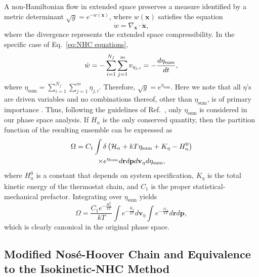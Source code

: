 \documentclass[
aip,
jcp,
reprint,
]{revtex4-1}
\newcommand{\vt}[1]{\boldsymbol{\mathbf{#1}}}          %
\begin{document}
A non-Hamiltonian flow in extended space preserves a measure identified by a metric determinant $\sqrt{g} = e^{-w(\vt x)}$, where $w(\vt x)$ satisfies the equation \cite{Tuckerman_1999, Tuckerman_2001}
\begin{equation}
\label{eq:extended space compressibility}
\dot{w} = \nabla_{\vt x} \cdot \dot{\vt x},
\end{equation}
where the divergence represents the extended space compressibility.
In the specific case of Eq.~\eqref{eq:NHC equations},
\begin{equation}
\dot{w} = -\sum_{i=1}^{N_f} \sum_{j=1}^m v_{\eta_{j,i}} = -\frac{d\eta_{\rm sum}}{dt},
\end{equation}
where $\eta_\mathrm{sum} = \sum_{i=1}^{N_f} \sum_{j=1}^m \eta_{j,i}$.
Therefore, $\sqrt{g} = e^{\eta_\mathrm{sum}}$.
Here we note that all $\eta$'s are driven variables and no combinations thereof, other than $\eta_\mathrm{sum}$, is of primary importance .
Thus, following the guidelines of Ref.~, only $\eta_\mathrm{sum}$ is considered in our phase space analysis.
If $H_n$ is the only conserved quantity, then the partition function of the resulting ensemble can be expressed as
\begin{multline}
\label{eq:NHC defined partition function}
\Omega = C_1 \int \delta\left(\mathcal{H}_n + kT\eta_{\rm sum} + K_\eta - H_n^0\right) \\
\times e^{\eta_{\rm sum}}  d{\vt r} d{\vt p} d{\vt v}_\eta d\eta_{\rm sum},
\end{multline}
where $H_n^0$ is a constant that depends on system specification,
$K_\eta$ is the total kinetic energy of the thermostat chain,
and $C_1$ is the proper statistical-mechanical prefactor.
Integrating over $\eta_\mathrm{sum}$ yields
\begin{equation}
\label{eq:NHC partition function}
\Omega = \frac{C_1 e^{-\frac{H_n^0}{kT}}}{kT} \int e^{-\frac{K_\eta}{kT}} d{\vt v}_\eta \int e^{-\frac{\mathcal{H}_n}{kT}}  d{\vt r} d{\vt p} ,
\end{equation}
which is clearly canonical in the original phase space.

\subsection{Modified Nos\'{e}-Hoover Chain and Equivalence to the Isokinetic-NHC Method}

\end{document}
